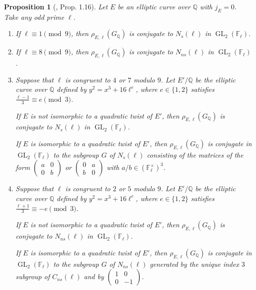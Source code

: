 \documentclass[11pt]{amsart}
\newtheorem{prop}[defn]{Proposition}
\theoremstyle{definition}
\newenvironment{romanenum}{\hfill \begin{enumerate} \renewcommand{\theenumi}{\roman{enumi}}}{\end{enumerate}}
\newcommand{\Q}{\mathbb Q}
\newcommand{\QQ}{\mathbb Q}
\newcommand{\FF}{\mathbb F}
\newcommand{\GL}{\operatorname{GL}}
\begin{document}
\begin{prop}[\cite{zywina}, Prop. 1.16]  \label{prop-zywina3}
Let $E$ be an elliptic curve over $\QQ$ with $j_E=0$.  Take any odd prime $\ell$.
\begin{romanenum}
\item  \label{P:j=0 situation i}
If $\ell \equiv 1 \pmod{9}$, then $\rho_{E,\ell}(G_\Q)$ is conjugate to $N_{s}(\ell)$ in $\GL_2(\FF_\ell)$.
\item \label{P:j=0 situation ii}
If $\ell \equiv 8 \pmod{9}$, then $\rho_{E,\ell}(G_\Q)$ is conjugate to $N_{ns}(\ell)$ in $\GL_2(\FF_\ell)$.
\item \label{P:j=0 situation iii}
Suppose that $\ell$ is congruent to $4$ or $7$ modulo $9$.  Let $E'/\QQ$ be the elliptic curve over $\QQ$ defined by $y^2=x^3+16 \ell^e$, where $e\in \{1,2\}$ satisfies $ \frac{\ell-1}{3} \equiv e \pmod{3}$.   

\noindent
If $E$ is not isomorphic to a quadratic twist of $E'$, then $\rho_{E,\ell}(G_\Q)$ is conjugate to $N_{s}(\ell)$ in $\GL_2(\FF_\ell)$.

\noindent 
If $E$ is isomorphic to a quadratic twist of $E'$, then $\rho_{E,\ell}(G_\Q)$ is conjugate in $\GL_2(\FF_\ell)$ to the subgroup $G$ of $N_s(\ell)$ consisting of the matrices of the form  $\left(\begin{smallmatrix} a & 0 \\0 & b\end{smallmatrix}\right)$ or $\left(\begin{smallmatrix} 0 & a \\b & 0 \end{smallmatrix}\right)$ with $a/b \in (\FF_\ell^\times)^3$.

\item 
\label{P:j=0 situation iv}
Suppose that $\ell$ is congruent to $2$ or $5$ modulo $9$.  Let $E'/\QQ$ be the elliptic curve over $\QQ$ defined by $y^2=x^3+16 \ell^e$, where $e\in \{1,2\}$ satisfies $ \frac{\ell+1}{3} \equiv -e \pmod{3}$.   

\noindent
If $E$ is not isomorphic to a quadratic twist of $E'$, then $\rho_{E,\ell}(G_\Q)$ is conjugate to $N_{ns}(\ell)$ in $\GL_2(\FF_\ell)$.

\noindent 
If $E$ is isomorphic to a quadratic twist of $E'$, then $\rho_{E,\ell}(G_\Q)$ is conjugate in $\GL_2(\FF_\ell)$ to the subgroup $G$ of $N_{ns}(\ell)$ generated by the unique index $3$ subgroup of $C_{ns}(\ell)$ and by $\left(\begin{smallmatrix} 1 & 0 \\0 & -1\end{smallmatrix}\right)$.


\end{romanenum}
\end{prop}
\end{document}
